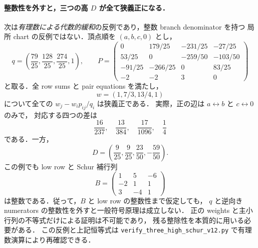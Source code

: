 \paragraph{整数性を外すと，三つの高 $D$ が全て狭義正になる．}
次は\emph{有理数による代数的緩和}の反例であり，整数 branch denominator を持つ
局所 chart の反例ではない．頂点順を $(a,b,c,0)$ とし，
\[
 q=\left(\frac{79}{25},\frac{128}{25},\frac{274}{25},1\right),\qquad
 P=\begin{pmatrix}
 0&179/25&-231/25&-27/25\\
 53/25&0&-259/50&-103/50\\
 -91/25&-266/25&0&83/25\\
 -2&-2&3&0
 \end{pmatrix}
\]
と取る．全 row sums と pair equations を満たし，
\[
 w=(1,7/3,13/4,1)
\]
について全ての $w_j-w_ip_{ij}/q_i$ は狭義正である．
実際，正の辺は $a\leftrightarrow b$ と $c\leftrightarrow0$ のみで，
対応する四つの差は
\[
 \frac{16}{237},\quad\frac{13}{384},\quad
 \frac{17}{1096},\quad\frac14
\]
である．一方，
\[
 D=\left(\frac9{25},\frac9{25},\frac{23}{50},-\frac{59}{50}\right).
\]
この例でも low row と Schur 補行列
\[
 B=\begin{pmatrix}1&5&-6\\-2&1&1\\3&-4&1\end{pmatrix}
\]
は整数である．従って，$B$ と low row の整数性まで仮定しても，
$q$ と逆向き numerators の整数性を外すと一般符号原理は成立しない．
正の weights と主小行列の不等式だけによる証明は不可能であり，
残る整除性を本質的に用いる必要がある．
この反例と上記恒等式は \texttt{verify\_three\_high\_schur\_v12.py} で有理数演算により再確認できる．

